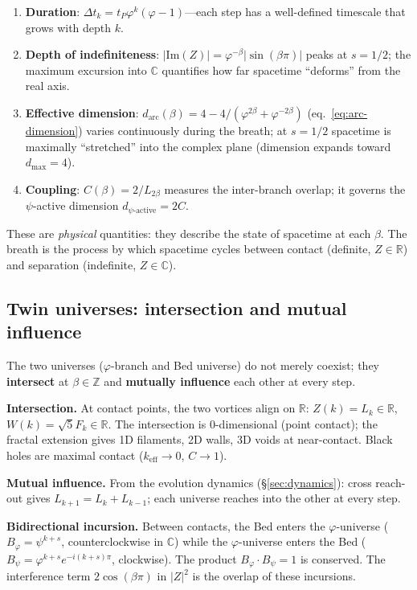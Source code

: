 \documentclass[12pt,a4paper]{article}
\newcommand{\bed}{Bed universe}
\begin{document}
\begin{enumerate}[nosep]
\item \textbf{Duration}: $\Delta t_k = t_P\varphi^k(\varphi-1)$---each step has a well-defined timescale that grows with depth $k$.
\item \textbf{Depth of indefiniteness}: $|\mathrm{Im}(Z)| = \varphi^{-\beta}|\sin(\beta\pi)|$ peaks at $s = 1/2$; the maximum excursion into $\mathbb{C}$ quantifies how far spacetime ``deforms'' from the real axis.
\item \textbf{Effective dimension}: $d_{\mathrm{arc}}(\beta) = 4 - 4/(\varphi^{2\beta} + \varphi^{-2\beta})$ (eq.~\ref{eq:arc-dimension}) varies continuously during the breath; at $s = 1/2$ spacetime is maximally ``stretched'' into the complex plane (dimension expands toward $d_{\max} = 4$).
\item \textbf{Coupling}: $C(\beta) = 2/L_{2\beta}$ measures the inter-branch overlap; it governs the $\psi$-active dimension $d_{\psi\text{-active}} = 2C$.
\end{enumerate}

\noindent These are \emph{physical} quantities: they describe the state of spacetime at each $\beta$. The breath is the process by which spacetime cycles between contact (definite, $Z \in \mathbb{R}$) and separation (indefinite, $Z \in \mathbb{C}$).

\subsection{Twin universes: intersection and mutual influence}

The two universes ($\varphi$-branch and \bed{}) do not merely coexist; they \textbf{intersect} at $\beta \in \mathbb{Z}$ and \textbf{mutually influence} each other at every step.

\textbf{Intersection.} At contact points, the two vortices align on $\mathbb{R}$: $Z(k) = L_k \in \mathbb{R}$, $W(k) = \sqrt{5}F_k \in \mathbb{R}$. The intersection is 0-dimensional (point contact); the fractal extension gives 1D filaments, 2D walls, 3D voids at near-contact. Black holes are maximal contact ($k_{\mathrm{eff}} \to 0$, $C \to 1$).

\textbf{Mutual influence.} From the evolution dynamics (\S\ref{sec:dynamics}): cross reach-out gives $L_{k+1} = L_k + L_{k-1}$; each universe reaches into the other at every step.

\textbf{Bidirectional incursion.} Between contacts, the Bed enters the $\varphi$-universe ($B_\varphi = \psi^{k+s}$, counterclockwise in $\mathbb{C}$) while the $\varphi$-universe enters the Bed ($B_\psi = \varphi^{k+s}e^{-i(k+s)\pi}$, clockwise). The product $B_\varphi \cdot B_\psi = 1$ is conserved. The interference term $2\cos(\beta\pi)$ in $|Z|^2$ is the overlap of these incursions.
\end{document}
